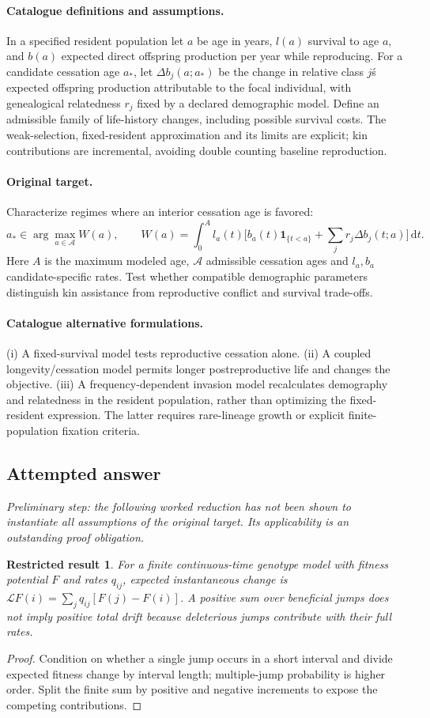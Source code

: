 \documentclass[11pt]{article}
\newcommand{\dd}{\,\mathrm d}
\newtheorem{attemptresult}{Restricted result}[section]
\begin{document}
\paragraph{Catalogue definitions and assumptions.}
In a specified resident population let $a$ be age in years, $l(a)$ survival to age $a$, and $b(a)$ expected direct offspring production per year while reproducing. For a candidate cessation age $a_*$, let $\Delta b_j(a;a_*)$ be the change in relative class $j$\'s expected offspring production attributable to the focal individual, with genealogical relatedness $r_j$ fixed by a declared demographic model. Define an admissible family of life-history changes, including possible survival costs. The weak-selection, fixed-resident approximation and its limits are explicit; kin contributions are incremental, avoiding double counting baseline reproduction.
\paragraph{Original target.}
Characterize regimes where an interior cessation age is favored:
    \[a_*\in\arg\max_{a\in\mathcal A} W(a),\qquad
    W(a)=\int_0^{A}l_a(t)
    \bigl[b_a(t)\mathbf1_{\{t<a\}}+\sum_jr_j\Delta b_j(t;a)\bigr]\dd t.\]
    Here $A$ is the maximum modeled age, $\mathcal A$ admissible cessation ages and $l_a,b_a$ candidate-specific rates. Test whether compatible demographic parameters distinguish kin assistance from reproductive conflict and survival trade-offs.
\paragraph{Catalogue alternative formulations.}
(i) A fixed-survival model tests reproductive cessation alone. (ii) A coupled longevity/cessation model permits longer postreproductive life and changes the objective. (iii) A frequency-dependent invasion model recalculates demography and relatedness in the resident population, rather than optimizing the fixed-resident expression. The latter requires rare-lineage growth or explicit finite-population fixation criteria.
\subsection{Attempted answer}
\noindent\emph{Preliminary step: the following worked reduction has not been shown to instantiate all assumptions of the original target. Its applicability is an outstanding proof obligation.}

\begin{attemptresult}
For a finite continuous-time genotype model with fitness potential $F$ and rates $q_{ij}$, expected instantaneous change is $\mathcal LF(i)=\sum_jq_{ij}[F(j)-F(i)]$. A positive sum over beneficial jumps does not imply positive total drift because deleterious jumps contribute with their full rates.
\end{attemptresult}
\begin{proof}
Condition on whether a single jump occurs in a short interval and divide expected fitness change by interval length; multiple-jump probability is higher order. Split the finite sum by positive and negative increments to expose the competing contributions.
\end{proof}
\end{document}
